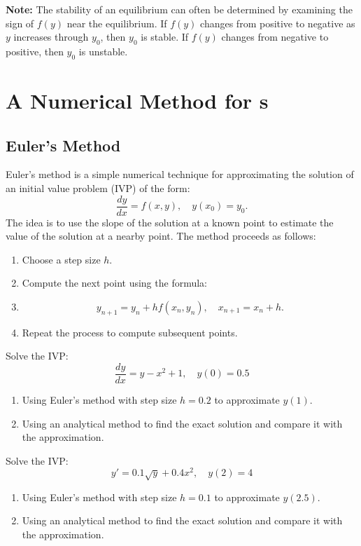 \textbf{Note:} The stability of an equilibrium can often be determined by examining the sign of \(f(y)\) near the equilibrium.
If \(f(y)\) changes from positive to negative as \(y\) increases through \(y_0\), then \(y_0\) is stable.
If \(f(y)\) changes from negative to positive, then \(y_0\) is unstable.




\section{A Numerical Method for \ode{}s}
\subsection{Euler's Method}
Euler's method is a simple numerical technique for approximating the solution of an initial value problem (IVP) of the form:
\[\frac{dy}{dx} = f(x,y), \quad y(x_0) = y_0.
\]
The idea is to use the slope of the solution at a known point to estimate the value of the solution at a nearby point.
The method proceeds as follows:
\begin{enumerate}
    \item Choose a step size \(h\).
    \item Compute the next point using the formula:
    \item \[y_{n+1} = y_n + h f(x_n, y_n), \quad x_{n+1} = x_n + h.\]
    \item Repeat the process to compute subsequent points.
\end{enumerate}


\begin{example}
  Solve the IVP:
  \[\frac{dy}{dx} = y - x^2 + 1, \quad y(0) = 0.5\]
  \begin{enumerate}
    \item Using Euler's method with step size \(h = 0.2\) to approximate \(y(1)\).
    \item Using an analytical method to find the exact solution and compare it with the approximation.
  \end{enumerate}
\end{example}


\begin{example}
  Solve the IVP:
  \[y' = 0.1\sqrt{y} + 0.4x^2 , \quad y(2) = 4\]
  \begin{enumerate}
    \item Using Euler's method with step size \(h = 0.1\) to approximate \(y(2.5)\).
    \item Using an analytical method to find the exact solution and compare it with the approximation.
  \end{enumerate}
\end{example}



